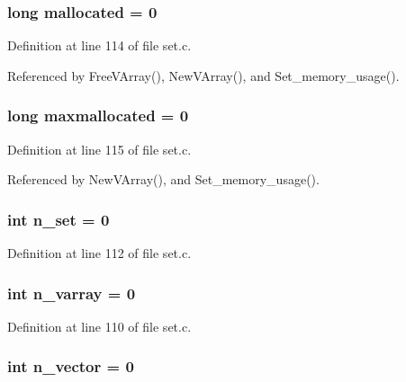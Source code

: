 \subsubsection{\setlength{\rightskip}{0pt plus 5cm}long \bf{mallocated} = 0\hspace{0.3cm}{\tt  [static]}}\label{set_8c_0ba4ea918288f9605c0ae638c6410370}




Definition at line 114 of file set.c.

Referenced by Free\-VArray(), New\-VArray(), and Set\_\-memory\_\-usage().
\subsubsection{\setlength{\rightskip}{0pt plus 5cm}long \bf{maxmallocated} = 0\hspace{0.3cm}{\tt  [static]}}\label{set_8c_d62b8152b70775f2ca19bd9f6b64d498}




Definition at line 115 of file set.c.

Referenced by New\-VArray(), and Set\_\-memory\_\-usage().
\subsubsection{\setlength{\rightskip}{0pt plus 5cm}int \bf{n\_\-set} = 0}\label{set_8c_4e63f522c9b8d8140d0fba066d33226a}




Definition at line 112 of file set.c.
\subsubsection{\setlength{\rightskip}{0pt plus 5cm}int \bf{n\_\-varray} = 0}\label{set_8c_fedecbfc0ffcd07c40c9a5128fae88ed}




Definition at line 110 of file set.c.
\subsubsection{\setlength{\rightskip}{0pt plus 5cm}int \bf{n\_\-vector} = 0}\label{set_8c_69fbf9f3893d93d739d4af8dea195721}




